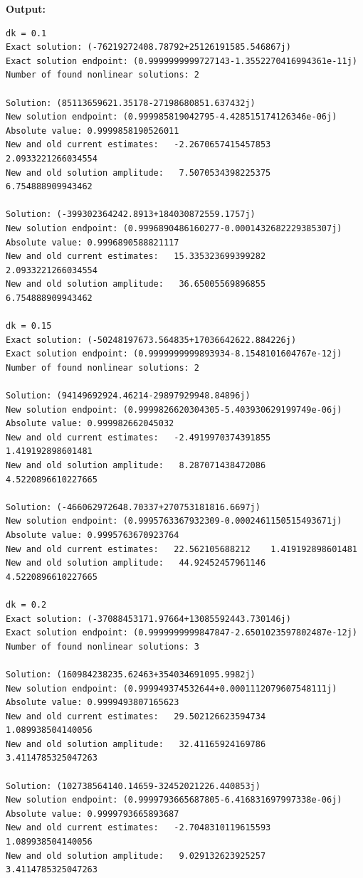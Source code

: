 \documentclass{article}
\begin{document}
\textbf{Output:}\begin{verbatim}
dk = 0.1
Exact solution: (-76219272408.78792+25126191585.546867j)
Exact solution endpoint: (0.9999999999727143-1.3552270416994361e-11j)
Number of found nonlinear solutions: 2

Solution: (85113659621.35178-27198680851.637432j)
New solution endpoint: (0.999985819042795-4.428515174126346e-06j) Absolute value: 0.9999858190526011
New and old current estimates:   -2.2670657415457853    2.0933221266034554
New and old solution amplitude:   7.5070534398225375    6.754888909943462

Solution: (-399302364242.8913+184030872559.1757j)
New solution endpoint: (0.9996890486160277-0.0001432682229385307j) Absolute value: 0.9996890588821117
New and old current estimates:   15.335323699399282    2.0933221266034554
New and old solution amplitude:   36.65005569896855    6.754888909943462

dk = 0.15
Exact solution: (-50248197673.564835+17036642622.884226j)
Exact solution endpoint: (0.9999999999893934-8.1548101604767e-12j)
Number of found nonlinear solutions: 2

Solution: (94149692924.46214-29897929948.84896j)
New solution endpoint: (0.9999826620304305-5.403930629199749e-06j) Absolute value: 0.999982662045032
New and old current estimates:   -2.4919970374391855    1.419192898601481
New and old solution amplitude:   8.287071438472086    4.5220896610227665

Solution: (-466062972648.70337+270753181816.6697j)
New solution endpoint: (0.9995763367932309-0.0002461150515493671j) Absolute value: 0.9995763670923764
New and old current estimates:   22.562105688212    1.419192898601481
New and old solution amplitude:   44.92452457961146    4.5220896610227665

dk = 0.2
Exact solution: (-37088453171.97664+13085592443.730146j)
Exact solution endpoint: (0.9999999999847847-2.6501023597802487e-12j)
Number of found nonlinear solutions: 3

Solution: (160984238235.62463+354034691095.9982j)
New solution endpoint: (0.999949374532644+0.0001112079607548111j) Absolute value: 0.9999493807165623
New and old current estimates:   29.502126623594734    1.089938504140056
New and old solution amplitude:   32.41165924169786    3.4114785325047263

Solution: (102738564140.14659-32452021226.440853j)
New solution endpoint: (0.9999793665687805-6.416831697997338e-06j) Absolute value: 0.9999793665893687
New and old current estimates:   -2.7048310119615593    1.089938504140056
New and old solution amplitude:   9.029132623925257    3.4114785325047263


\end{verbatim}
\end{document}
